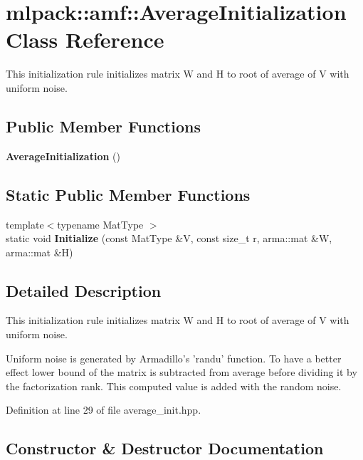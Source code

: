 \section{mlpack\-:\-:amf\-:\-:Average\-Initialization Class Reference}
\label{classmlpack_1_1amf_1_1AverageInitialization}


This initialization rule initializes matrix W and H to root of average of V with uniform noise.  


\subsection*{Public Member Functions}
\begin{DoxyCompactItemize}
\item 
{\bf Average\-Initialization} ()
\end{DoxyCompactItemize}
\subsection*{Static Public Member Functions}
\begin{DoxyCompactItemize}
\item 
{\footnotesize template$<$typename Mat\-Type $>$ }\\static void {\bf Initialize} (const Mat\-Type \&V, const size\-\_\-t r, arma\-::mat \&W, arma\-::mat \&H)
\end{DoxyCompactItemize}


\subsection{Detailed Description}
This initialization rule initializes matrix W and H to root of average of V with uniform noise. 

Uniform noise is generated by Armadillo's 'randu' function. To have a better effect lower bound of the matrix is subtracted from average before dividing it by the factorization rank. This computed value is added with the random noise. 

Definition at line 29 of file average\-\_\-init.\-hpp.



\subsection{Constructor \& Destructor Documentation}
